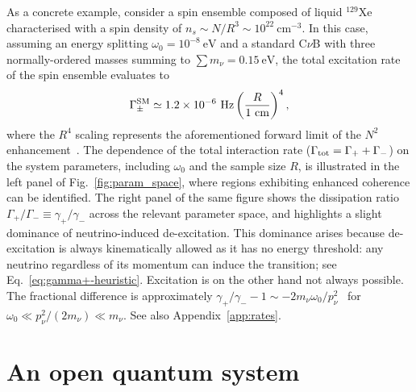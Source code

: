 \documentclass[aps,prd,10pt,twocolumn,superscriptaddress,floatfix,nofootinbib,amsmath,amssymb,altaffilletter,preprintnumbers]{revtex4-1}
\begin{document}
As a concrete example, consider a spin ensemble composed of liquid $^{129}$Xe  characterised with a spin density of $n_s \sim N/R^3 \sim  10^{22}~\text{cm}^{-3}$. In this case, assuming an energy splitting $\omega_0 = 10^{-8}~\text{eV}$ 
and a standard  C$\nu$B with three normally-ordered masses summing to $\sum m_\nu = 0.15~\text{eV}$,
the total excitation rate of the spin ensemble evaluates to
\begin{equation}
 \Gamma_\pm^{\rm SM} \simeq 1.2 \times 10^{-6}~\text{Hz} \left( \frac{R}{1~\text{cm}} \right)^4,
\end{equation}
where the $R^4$ scaling represents the aforementioned forward limit of the $N^2$ enhancement~\cite{Arvanitaki:2024taq}.
The dependence of the total interaction rate ($\Gamma_{\rm tot}=\Gamma_++\Gamma_-$) on the system parameters, including $\omega_0$ and the sample size $R$, is illustrated in the left panel of Fig.~\ref{fig:param_space}, where regions exhibiting enhanced coherence can be identified. The right panel of the same figure shows the dissipation ratio $\Gamma_+/\Gamma_-\equiv\gamma_+/\gamma_-$ across the relevant parameter space, and highlights a slight dominance of neutrino-induced de-excitation. This dominance arises because de-excitation is always kinematically allowed as it has no energy threshold: any neutrino regardless of its momentum can induce the transition; see Eq.~\eqref{eq:gamma+-heuristic}.  Excitation is on the other hand not always possible.  The fractional difference is approximately $\gamma_+/\gamma_- -1  \sim - 2 m_\nu \omega_0/p_\nu^2$~\cite{Arvanitaki:2024taq} for $\omega_0 \ll p_\nu^2/(2 m_\nu) \ll m_\nu$.  See also Appendix~\ref{app:rates}.




\section{An open quantum system}\label{sec:oqs}
\end{document}
